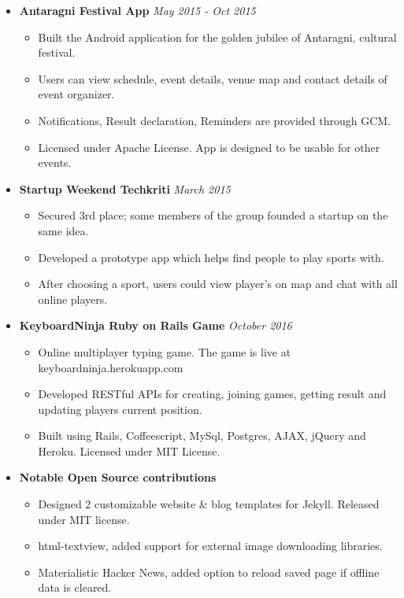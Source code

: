 \documentclass[a4paper]{article}
\begin{document}
\begin{itemize}
\begin{itemize}
	      \end{itemize}
	\item
	      \textbf{Antaragni Festival App}
	      \hfill \textit{May 2015 - Oct 2015}
	      \begin{itemize}
	      	\vspace{-2mm} \setlength\itemsep{-0.2em}
	      	\item Built the Android application for the golden jubilee of Antaragni, cultural festival.
	      	\item Users can view schedule, event details, venue map and contact details of event organizer.
	      	\item Notifications, Result declaration, Reminders are provided through GCM.
	      	\item Licensed under Apache License. App is designed to be usable for other events.
	      \end{itemize}
	\item
	      \textbf{Startup Weekend  Techkriti}
	      \hfill \textit{March 2015}
	      \begin{itemize}
	      	\vspace{-2mm} \setlength\itemsep{-0.2em}
	      	\item Secured 3rd place; some members of the group founded a startup on the same idea.
	      	\item Developed a prototype app which helps find people to play sports with.
	      	\item After choosing a sport, users could view player's on map and chat with all online players.
	      \end{itemize}
	\item
	      \textbf{KeyboardNinja Ruby on Rails Game}
	      \hfill \textit{October 2016}
	      \begin{itemize}
		\vspace{-2mm} \setlength\itemsep{-0.2em}
		\item Online multiplayer typing game. The game is live at keyboardninja.herokuapp.com
		\item Developed RESTful APIs for creating, joining games, getting result and updating players current position.
		\item Built using Rails, Coffeescript, MySql, Postgres, AJAX, jQuery and Heroku. Licensed under MIT License.
	      \end{itemize}
	\item
	      \textbf{Notable Open Source contributions}
	      \begin{itemize}
	      	\vspace{-2mm} \setlength\itemsep{-0.2em}
	      	\item Designed 2 customizable website \& blog templates for Jekyll. Released under MIT license.
	      	\item html-textview, added support for external image downloading libraries.
	      	\item Materialistic Hacker News, added option to reload saved page if offline data is cleared.
	      \end{itemize}
\end{itemize}
\end{document}
